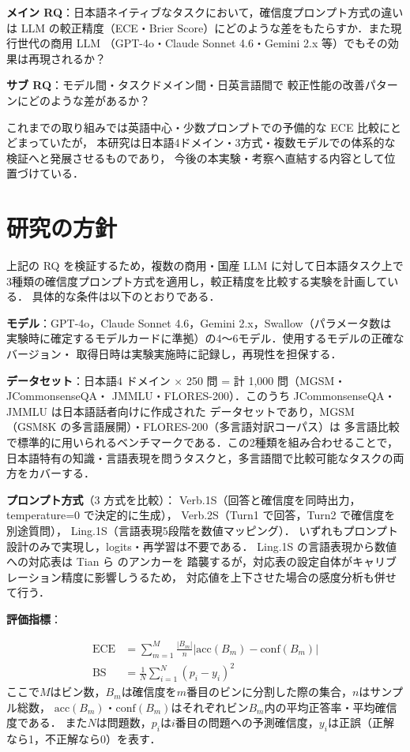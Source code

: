 \documentclass[10pt,a4paper,twocolumn]{article}
\begin{document}
\textbf{メイン RQ}：日本語ネイティブなタスクにおいて，確信度プロンプト方式の違いは
LLM の較正精度（ECE・Brier Score）にどのような差をもたらすか．また現行世代の商用 LLM
（GPT-4o・Claude Sonnet 4.6・Gemini 2.x 等）でもその効果は再現されるか？

\textbf{サブ RQ}：モデル間・タスクドメイン間・日英言語間で
較正性能の改善パターンにどのような差があるか？

これまでの取り組みでは英語中心・少数プロンプトでの予備的な ECE 比較にとどまっていたが，
本研究は日本語4ドメイン・3方式・複数モデルでの体系的な検証へと発展させるものであり，
今後の本実験・考察へ直結する内容として位置づけている．

\section{研究の方針}

上記の RQ を検証するため，複数の商用・国産 LLM に対して日本語タスク上で
3種類の確信度プロンプト方式を適用し，較正精度を比較する実験を計画している．
具体的な条件は以下のとおりである．

\textbf{モデル}：GPT-4o，Claude Sonnet 4.6，Gemini 2.x，Swallow（パラメータ数は
実験時に確定するモデルカードに準拠）の4〜6モデル．使用するモデルの正確なバージョン・
取得日時は実験実施時に記録し，再現性を担保する．

\textbf{データセット}：日本語4 ドメイン × 250 問 = 計 1,000 問（MGSM・JCommonsenseQA・
JMMLU・FLORES-200）．このうち JCommonsenseQA・JMMLU は日本語話者向けに作成された
データセットであり，MGSM（GSM8K の多言語展開）・FLORES-200（多言語対訳コーパス）は
多言語比較で標準的に用いられるベンチマークである．この2種類を組み合わせることで，
日本語特有の知識・言語表現を問うタスクと，多言語間で比較可能なタスクの両方をカバーする．

\textbf{プロンプト方式}（3 方式を比較）：
Verb.1S（回答と確信度を同時出力，temperature=0 で決定的に生成），
Verb.2S（Turn1 で回答，Turn2 で確信度を別途質問），
Ling.1S（言語表現5段階を数値マッピング）．
いずれもプロンプト設計のみで実現し，logits・再学習は不要である．
Ling.1S の言語表現から数値への対応表は Tian ら\cite{tian2023just} のアンカーを
踏襲するが，対応表の設定自体がキャリブレーション精度に影響しうるため，
対応値を上下させた場合の感度分析も併せて行う．

\textbf{評価指標}：

\begin{align}
  \text{ECE} &= \sum_{m=1}^{M} \frac{|B_m|}{n} \left|\text{acc}(B_m) - \text{conf}(B_m)\right| \\
  \text{BS} &= \frac{1}{N} \sum_{i=1}^{N} (p_i - y_i)^2
\end{align}
ここで$M$はビン数，$B_m$は確信度を$m$番目のビンに分割した際の集合，$n$はサンプル総数，
$\text{acc}(B_m)$・$\text{conf}(B_m)$はそれぞれビン$B_m$内の平均正答率・平均確信度である．
また$N$は問題数，$p_i$は$i$番目の問題への予測確信度，$y_i$は正誤（正解なら1，不正解なら0）を表す．
\end{document}
